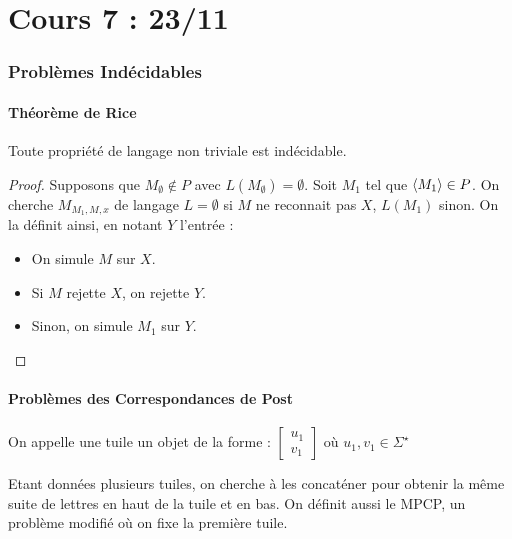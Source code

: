 \documentclass{cours}
\begin{document}
\part[Indécidabilité]{Cours 7 : 23/11}

\section{Problèmes Indécidables}
\subsection{Théorème de Rice}
\begin{theorem}[Rice]
    Toute propriété de langage non triviale est indécidable.
\end{theorem}

\begin{proof}
    Supposons que $M_{\emptyset} \notin P$ avec $L\left(M_{\emptyset}\right) = \emptyset$. Soit $M_{1}$ tel que $\left\langle M_{1} \right\rangle \in P$. On cherche $M_{M_{1}, M, x}$ de langage $L = \emptyset$ si $M$ ne reconnait pas $X$, $L(M_{1})$ sinon. On la définit ainsi, en notant $Y$ l'entrée : \\
    \begin{itemize}
        \item On simule $M$ sur $X$.
        \item Si $M$ rejette $X$, on rejette $Y$.
        \item Sinon, on simule $M_{1}$ sur $Y$. 
    \end{itemize}
\end{proof}

\subsection{Problèmes des Correspondances de Post}
\begin{definition}
    On appelle une tuile un objet de la forme : $\left[\begin{array}{c}u_{1} \\ v_{1} \end{array}\right]$ où $u_{1}, v_{1} \in \Sigma^{\star}$ 
\end{definition}

\begin{definition}[$PCP$]
    Etant données plusieurs tuiles, on cherche à les concaténer pour obtenir la même suite de lettres en haut de la tuile et en bas. On définit aussi le MPCP, un problème modifié où on fixe la première tuile.
\end{definition}
\end{document}
